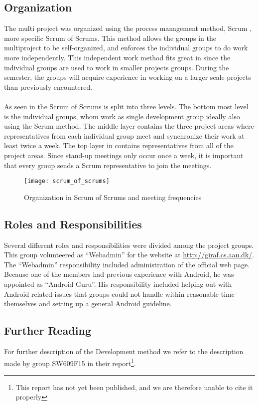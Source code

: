 \subsection{Organization}
The multi project was organized using the process management method, Scrum \parencite{scrum}, more specific Scrum of Scrums. This method allows the groups in the multiproject to be self-organized, and enforces the individual groups to do work more independently. This independent work method fits great in since the individual groups are used to work in smaller projects groups. During the semester, the groups will acquire experience in working on a larger scale projects than previously encountered.
\\\\
As seen in  the Scrum of Scrums is split into three levels. The bottom most level is the individual groups, whom work as single development group ideally also using the Scrum method. The middle layer contains the three project areas where representatives from each individual group meet and synchronize their work at least twice a week. The top layer in  contains representatives from all of the project areas. Since stand-up meetings only occur once a week, it is important that every group sends a Scrum representative to join the meetings.

\begin{figure}[!htbp]
  \centering
    \texttt{[image: scrum\_of\_scrums]}
    \caption{Organization in Scrum of Scrums and meeting frequencies}
    \label{fig:scrum_of_scrums}
\end{figure}

\subsection{Roles and Responsibilities}
Several different roles and responsibilities were divided among the project groups. This group volunteered as ``Webadmin'' for the website at \url{http://giraf.cs.aau.dk/}. The ``Webadmin'' responsibility included administration of the official \giraf web page. Because one of the members had previous experience with Android, he was appointed as ``Android Guru''. His responsibility included helping out with Android related issues that groups could not handle within reasonable time themselves and setting up a general Android guideline.

\subsection{Further Reading}
For further description of the \giraf Development method we refer to the description made by group SW609F15 in their report\footnote{This report has not yet been published, and we are therefore unable to cite it properly}.
